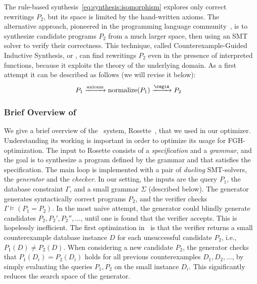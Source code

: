 The rule-based synthesis~\eqref{eq:synthesis:isomorphism} explores
only correct rewritings $P_2$, but its space is limited by the
hand-written axioms. The alternative approach, pioneered in the
programming language
community~\cite{DBLP:conf/asplos/Solar-LezamaTBSS06}, is to synthesize
candidate programs $P_2$ from a much larger space, then using an SMT
solver to verify their correctness.  This technique, called
Counterexample-Guided Inductive Synthesis, or \cegis, can find
rewritings $P_2$ even in the presence of interpreted functions,
because it exploits the theory of the underlying domain.  As a first
attempt it can be described as follows (we will revise it below):
%
\begin{align}
  P_{1} \xrightarrow[]{\text{axioms}} \text{normalize}(P_{1}) \xrightarrow[]{\cegis} P_{2}
  \label{eq:synthesis:cegis}
\end{align}
%

\subsubsection{Brief Overview of \cegis} We give a brief overview of
the \cegis\ system,
Rosette~\cite{DBLP:conf/tacas/TorlakJ07,DBLP:conf/oopsla/TorlakB13},
that we used in our optimizer.  Understanding its working is
important in order to optimize its usage for FGH-optimization.  The
input to Rosette consists of a {\em specification} and a {\em
  grammar}, and the goal is to synthesize a program defined by the
grammar and that satisfies the specification.
The main loop is implemented with a pair of {\em dueling} SMT-solvers,
the {\em generator} and the {\em checker}.  In our setting, the inputs
are the query $P_1$, the database constraint $\Gamma$, and a small
grammar $\Sigma$ (described below).    The generator generates syntactically correct programs
$P_2$, and the verifier checks $\Gamma \models (P_1 = P_2)$.  In the
most naive attempt, the generator could blindly generate candidates
$P_2, P_2', P_2'', \ldots$, until one is found that the verifier
accepts.  This is hopelessly inefficient.  The first optimization in
\cegis\ is that the verifier returns a small counterexample database
instance $D$ for each unsuccessful candidate $P_2$, i.e.,
$P_1(D)\neq P_2(D)$.  When considering a new candidate $P_2$, the
generator checks that $P_1(D_i) = P_2(D_i)$ holds for all previous
counterexamples $D_1, D_2, \ldots$, by simply evaluating the queries
$P_1,P_2$ on the small instance $D_i$.  This significantly reduces the
search space of the generator.

